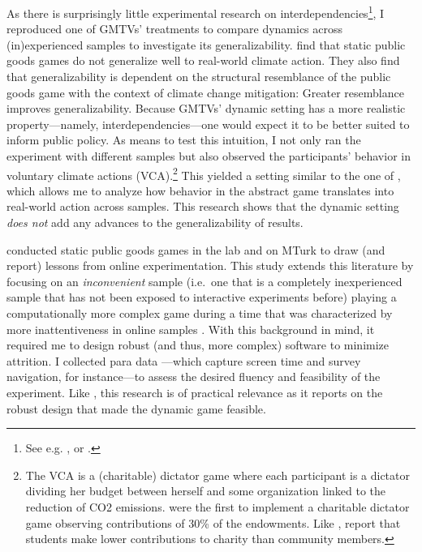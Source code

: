 \documentclass[
  authoryear,
  review,
  3p,
  onecolumn]{elsarticle}
\begin{document}
As there is surprisingly little experimental research on
interdependencies\footnote{See e.g. \citet{BattagliniEtAl2016},
  \citet{Rockenbach2017} or \citet{Moser2019}.}, I reproduced one of
GMTVs' treatments to compare dynamics across (in)experienced samples to
investigate its generalizability. \citet{GKLS2020} find that static
public goods games do not generalize well to real-world climate action.
They also find that generalizability is dependent on the structural
resemblance of the public goods game with the context of climate change
mitigation: Greater resemblance improves generalizability. Because
GMTVs' dynamic setting has a more realistic property---namely,
interdependencies---one would expect it to be better suited to inform
public policy. As means to test this intuition, I not only ran the
experiment with different samples but also observed the participants'
behavior in voluntary climate actions (VCA).\footnote{The VCA is a
  (charitable) dictator game where each participant is a dictator
  dividing her budget between herself and some organization linked to
  the reduction of CO2 emissions. \citet{EckelGrossman1996} were the
  first to implement a charitable dictator game observing contributions
  of 30\% of the endowments. Like \citet{GKLS2020},
  \citet{CarpenterEtAl2008} report that students make lower
  contributions to charity than community members.} This yielded a
setting similar to the one of \citet{GKLS2020}, which allows me to
analyze how behavior in the abstract game translates into real-world
action across samples. This research shows that the dynamic setting
\emph{does not} add any advances to the generalizability of results.

\citet{AGM2018} conducted static public goods games in the lab and on
MTurk to draw (and report) lessons from online experimentation. This
study extends this literature \citetext{\citealp[see,
e.g.,][\citet{AmirEtAl2012}]{KrantzEtAl1997}; \citealp{KleinEtAl2014}; \citealp{PaolacciChandler2014}; \citealp{GoodmanPaolacci2017}; \citealp{SnowbergYariv_2021}; \citealp{GuptaRigottiWilson_2021}; \citealp{BusoEtAl2021}}
by focusing on an \emph{inconvenient} sample (i.e.~one that is a
completely inexperienced sample \citep[see also][]{BenndorfEtAl2017}
that has not been exposed to interactive experiments before) playing a
computationally more complex game during a time that was characterized
by more inattentiveness in online samples
\citep{ArecharRand2021, PeytonEtAl2022}. With this background in mind,
it required me to design robust (and thus, more complex) software to
minimize attrition. I collected para data \citep[
p.~12]{Parsons2022}---which capture screen time and survey navigation,
for instance---to assess the desired fluency and feasibility of the
experiment. Like \citet{AGM2018}, this research is of practical
relevance as it reports on the robust design that made the dynamic game
feasible.
\end{document}
